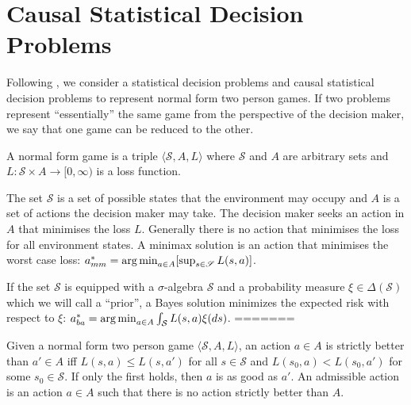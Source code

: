 \section{Causal Statistical Decision Problems}

Following \citep{toutenburg_ferguson_1970}, we consider a statistical decision problems and causal statistical decision problems to represent normal form two person games. If two problems represent ``essentially'' the same game from the perspective of the decision maker, we say that one game can be reduced to the other.


\begin{definition}
A normal form game is a triple $\langle \mathscr{S}, A, L\rangle$ where $\mathscr{S}$ and $A$ are arbitrary sets and $L:\mathscr{S}\times A\to [0,\infty)$ is a loss function.
\end{definition}
The set $\mathscr{S}$ is a set of possible states that the environment may occupy and $A$ is a set of actions the decision maker may take. The decision maker seeks an action in $A$ that minimises the loss $L$. Generally there is no action that minimises the loss for all environment states. A minimax solution is an action that minimises the worst case loss: $a^*_{mm} = \operatorname*{arg\,min}_{a\in A} [\sup_{s\in \mathscr{S}} L(s,a)]$.

If the set $\mathscr{S}$ is equipped with a $\sigma$-algebra $\mathcal{S}$ and a probability measure $\xi\in \Delta(\mathcal{S})$ which we will call a ``prior'', a Bayes solution minimizes the expected risk with respect to $\xi$: $a^*_{ba} = \operatorname*{arg\,min}_{a\in A} \int_{\mathcal{S}} L(s,a) \xi(ds)$.
=======


\begin{definition}
Given a normal form two person game $\langle \mathscr{S}, A, L\rangle$, an action $a\in A$ is strictly better than $a'\in A$ iff $L(s,a)\leq L(s,a')$ for all $s\in\mathscr{S}$ and $L(s_0,a)<L(s_0,a')$ for some $s_0\in \mathscr{S}$. If only the first holds, then $a$ is as good as $a'$. An admissible action is an action $a\in A$ such that there is no action strictly better than $A$.
\end{definition}

